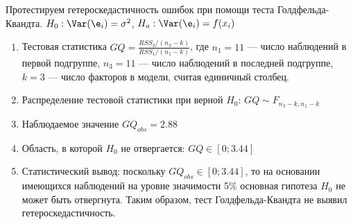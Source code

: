 \documentclass[pdftex,11pt,openany]{book}\usepackage[]{graphicx}\usepackage[]{color}
\begin{document}
\begin{solution}
Протестируем гетероскедастичность ошибок при помощи теста Голдфельда-
Квандта. $H_0: \Var(\e_i)=\sigma^2$, $H_a: \Var(\e_i)=f(x_i)$

\begin{enumerate}
\item Тестовая статистика $GQ=\frac{RSS_3/(n_3-k)}{RSS_1/(n_1-k)}$, где $n_1=11$ --- число наблюдений в первой подгруппе, $n_3=11$ --- число наблюдений в
последней подгруппе, $k=3$ --- число факторов в модели, считая единичный столбец.
\item Распределение тестовой статистики при верной $H_0$: $GQ\sim F_{n_3-k,n_1-k}$
\item Наблюдаемое значение $GQ_{obs}=2.88$
\item Область, в которой $H_0$ не отвергается: $GQ\in [0;3.44]$
\item Статистический вывод: поскольку $GQ_{obs} \in [0;3.44]$, то на основании имеющихся наблюдений на уровне значимости 5\% основная гипотеза $H_0$ не может быть отвергнута. Таким образом, тест Голдфельда-Квандта не выявил гетероскедастичность.
\end{enumerate}
\end{solution}
\end{document}
